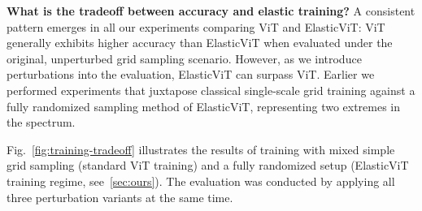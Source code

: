 \documentclass[10pt,twocolumn,letterpaper]{article}
\newcommand{\ours}[0]{ElasticViT\xspace}
\begin{document}

\textbf{What is the tradeoff between accuracy and elastic training?}
A consistent pattern emerges in all our experiments comparing ViT and ElasticViT: ViT generally exhibits higher accuracy than ElasticViT when evaluated under the original, unperturbed grid sampling scenario. However, as we introduce perturbations into the evaluation, ElasticViT can surpass ViT. Earlier we performed experiments that juxtapose classical single-scale grid training against a fully randomized sampling method of ElasticViT, representing two extremes in the spectrum.

Fig.~\ref{fig:training-tradeoff} illustrates the results of training with mixed simple grid sampling (standard ViT training) and a fully randomized setup (\ours{} training regime, see~\ref{sec:ours}). The evaluation was conducted by applying all three perturbation variants at the same time.
\end{document}
